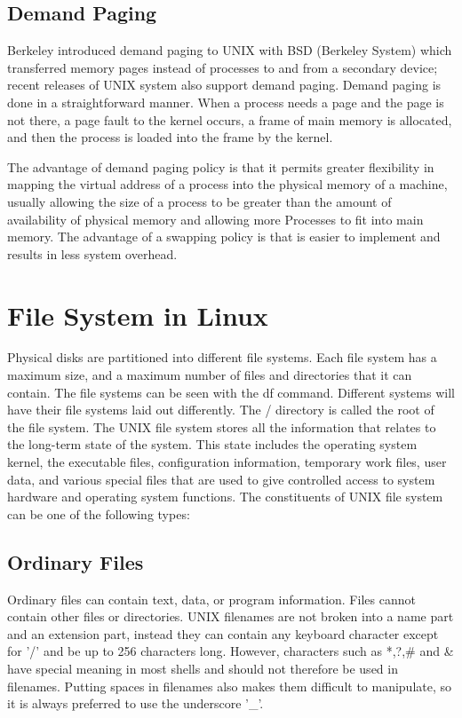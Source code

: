\documentclass{article}
\begin{document}
\subsection{Demand Paging}
Berkeley introduced demand paging to UNIX with BSD (Berkeley System) which
transferred memory pages instead of processes to and from a secondary device; recent
releases of UNIX system also support demand paging. Demand paging is done in a
straightforward manner. When a process needs a page and the page is not there, a page
fault to the kernel occurs, a frame of main memory is allocated, and then the process
is loaded into the frame by the kernel.

The advantage of demand paging policy is that it permits greater flexibility in
mapping the virtual address of a process into the physical memory of a machine,
usually allowing the size of a process to be greater than the amount of availability of
physical memory and allowing more Processes to fit into main memory. The
advantage of a swapping policy is that is easier to implement and results in less
system overhead.

\section{File System in Linux}
Physical disks are partitioned into different file systems. Each file system has a
maximum size, and a maximum number of files and directories that it can contain.
The file systems can be seen with the df command. Different systems will have their
file systems laid out differently. The / directory is called the root of the file system.
The UNIX file system stores all the information that relates to the long-term state of
the system. This state includes the operating system kernel, the executable files,
configuration information, temporary work files, user data, and various special files
that are used to give controlled access to system hardware and operating system
functions.
The constituents of UNIX file system can be one of the following types:

\subsection{Ordinary Files}
Ordinary files can contain text, data, or program information. Files cannot contain
other files or directories. UNIX filenames are not broken into a name part and an
extension part, instead they can contain any keyboard character except for '/' and be up
to 256 characters long. However, characters such as *,?,\#  and \& have special meaning
in most shells and should not therefore be used in filenames. Putting spaces in
filenames also makes them difficult to manipulate, so it is always preferred to use the
underscore '\_'.
\end{document}
